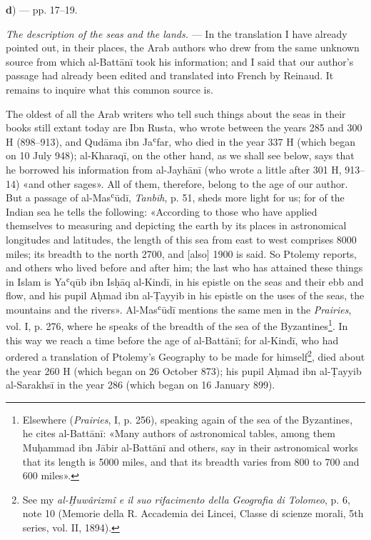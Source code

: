 \documentclass[11pt]{article}
\begin{document}
\par\begin{center}\textbf{d}) — pp. 17–19.\end{center}
\par \emph{The description of the seas and the lands.} — In the translation I have already pointed out, in their places, the Arab authors who drew from the same unknown source from which al-Battānī took his information; and I said that our author's passage had already been edited and translated into French by Reinaud. It remains to inquire what this common source is.\par
\par The oldest of all the Arab writers who tell such things about the seas in their books still extant today are Ibn Rusta, who wrote between the years 285 and 300 H (898–913), and Qudāma ibn Jaʿfar, who died in the year 337 H (which began on 10 July 948); al-Kharaqī, on the other hand, as we shall see below, says that he borrowed his information from al-Jayhānī (who wrote a little after 301 H, 913–14) «and other sages». All of them, therefore, belong to the age of our author. But a passage of al-Masʿūdī, \emph{Tanbīh}, p. 51, sheds more light for us; for of the Indian sea he tells the following: «According to those who have applied themselves to measuring and depicting the earth by its places in astronomical longitudes and latitudes, the length of this sea from east to west comprises 8000 miles; its breadth to the north 2700, and [also] 1900 is said. So Ptolemy reports, and others who lived before and after him; the last who has attained these things in Islam is Yaʿqūb ibn Isḥāq al-Kindī, in his epistle on the seas and their ebb and flow, and his pupil Aḥmad ibn al-Ṭayyib in his epistle on the uses of the seas, the mountains and the rivers». Al-Masʿūdī mentions the same men in the \emph{Prairies}, vol. I, p. 276, where he speaks of the breadth of the sea of the Byzantines\footnote{Elsewhere (\emph{Prairies}, I, p. 256), speaking again of the sea of the Byzantines, he cites al-Battānī: «Many authors of astronomical tables, among them Muḥammad ibn Jābir al-Battānī and others, say in their astronomical works that its length is 5000 miles, and that its breadth varies from 800 to 700 and 600 miles».}. In this way we reach a time before the age of al-Battānī; for al-Kindī, who had ordered a translation of Ptolemy's Geography to be made for himself\footnote{See my \emph{al-Ḫuwârizmî e il suo rifacimento della Geografia di Tolomeo}, p. 6, note 10 (Memorie della R. Accademia dei Lincei, Classe di scienze morali, 5th series, vol. II, 1894).}, died about the year 260 H (which began on 26 October 873); his pupil Aḥmad ibn al-Ṭayyib al-Sarakhsī in the year 286 (which began on 16 January 899).\par
\end{document}

